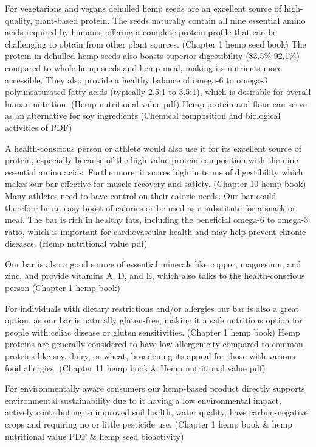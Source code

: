 \vspace{1em}
For vegetarians and vegans dehulled hemp seeds are an excellent source of high-quality, plant-based protein. The seeds naturally contain all nine essential amino acids required by humans, offering a complete protein profile that can be challenging to obtain from other plant sources. (Chapter 1 hemp seed book) The protein in dehulled hemp seeds also boasts superior digestibility (83.5\%-92.1\%) compared to whole hemp seeds and hemp meal, making its nutrients more accessible. They also provide a healthy balance of omega-6 to omega-3 polyunsaturated fatty acids (typically 2.5:1 to 3.5:1), which is desirable for overall human nutrition. (Hemp nutritional value pdf) Hemp protein and flour can serve as an alternative for soy ingredients (Chemical composition and biological activities of PDF) 

\vspace{1em}
A health-conscious person or athlete would also use it for its excellent source of protein, especially because of the high value protein composition with the nine essential amino acids. Furthermore, it scores high in terms of digestibility which makes our bar effective for muscle recovery and satiety. (Chapter 10 hemp book) Many athletes need to have control on their calorie needs. Our bar could therefore be an easy boost of calories or be used as a substitute for a snack or meal.
\vspace{0.5em}
The bar is rich in healthy fats, including the beneficial omega-6 to omega-3 ratio, which is important for cardiovascular health and may help prevent chronic diseases. (Hemp nutritional value pdf)

\vspace{1em}
Our bar is also a good source of essential minerals like copper, magnesium, and zinc, and provide vitamins A, D, and E, which also talks to the health-conscious person (Chapter 1 hemp book)

\vspace{1em}
For individuals with dietary restrictions and/or allergies our bar is also a great option, as our bar is naturally gluten-free, making it a safe nutritious option for people with celiac disease or gluten sensitivities. (Chapter 1 hemp book) Hemp proteins are generally considered to have low allergenicity compared to common proteins like soy, dairy, or wheat, broadening its appeal for those with various food allergies. (Chapter 11 hemp book \& Hemp nutritional value pdf)

\vspace{1em}
For environmentally aware consumers our hemp-based product directly supports environmental sustainability due to it having a low environmental impact, actively contributing to improved soil health, water quality, have carbon-negative crops and requiring no or little pesticide use. (Chapter 1 hemp book \& hemp nutritional value PDF \& hemp seed bioactivity) 

